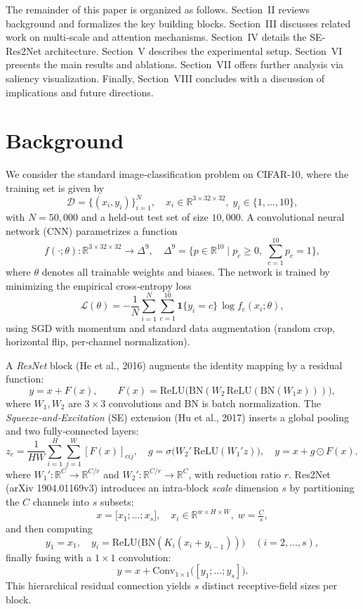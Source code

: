 \documentclass{article}
\begin{document}
The remainder of this paper is organized as follows. Section~II reviews background and formalizes the key building blocks. Section~III discusses related work on multi‐scale and attention mechanisms. Section~IV details the SE‐Res2Net architecture. Section~V describes the experimental setup. Section~VI presents the main results and ablations. Section~VII offers further analysis via saliency visualization. Finally, Section~VIII concludes with a discussion of implications and future directions.
\section{Background}
We consider the standard image‐classification problem on CIFAR‐10, where the training set is given by
\[
\mathcal{D} = \bigl\{(x_i,y_i)\bigr\}_{i=1}^N,\quad
x_i\in\mathbb{R}^{3\times32\times32},\;
y_i\in\{1,\dots,10\},
\]
with \(N=50{,}000\) and a held‐out test set of size \(10{,}000\).  A convolutional neural network (CNN) parametrizes a function
\[
f(\cdot;\theta)\colon\mathbb{R}^{3\times32\times32}\to\Delta^{9},\quad
\Delta^{9}=\{p\in\mathbb{R}^{10}\mid p_c\ge0,\;\sum_{c=1}^{10}p_c=1\},
\]
where \(\theta\) denotes all trainable weights and biases.  The network is trained by minimizing the empirical cross‐entropy loss
\[
\mathcal{L}(\theta)
=-\frac{1}{N}\sum_{i=1}^N\sum_{c=1}^{10}\mathbf{1}\{y_i=c\}\,\log f_c(x_i;\theta),
\]
using SGD with momentum and standard data augmentation (random crop, horizontal flip, per‐channel normalization).  

A \emph{ResNet} block (He et al., 2016) augments the identity mapping by a residual function:
\[
y = x + F(x),\qquad
F(x)=\mathrm{ReLU}\bigl(\mathrm{BN}(W_2\,\mathrm{ReLU}(\mathrm{BN}(W_1 x)))\bigr),
\]
where \(W_1,W_2\) are \(3\times3\) convolutions and BN is batch normalization.  The \emph{Squeeze‐and‐Excitation} (SE) extension (Hu et al., 2017) inserts a global pooling and two fully‐connected layers:
\[
z_c = \frac{1}{H W}\sum_{i=1}^H\sum_{j=1}^W [F(x)]_{cij},\quad
g = \sigma\bigl(W_2'\,\mathrm{ReLU}(W_1' z)\bigr),\quad
y = x + g\odot F(x),
\]
where \(W_1':\mathbb{R}^C\!\to\!\mathbb{R}^{C/r}\) and \(W_2':\mathbb{R}^{C/r}\!\to\!\mathbb{R}^C\), with reduction ratio \(r\).  Res2Net (arXiv 1904.01169v3) introduces an intra‐block \emph{scale} dimension \(s\) by partitioning the \(C\) channels into \(s\) subsets:
\[
x = \bigl[x_1;\dots;x_s\bigr],\quad x_i\in\mathbb{R}^{w\times H\times W},\;w=\tfrac{C}{s},
\]
and then computing
\[
y_1 = x_1,\quad
y_i = \mathrm{ReLU}\bigl(\mathrm{BN}(K_i(x_i + y_{i-1}))\bigr)\quad (i=2,\dots,s),
\]
finally fusing with a \(1\times1\) convolution:
\[
y = x + \mathrm{Conv}_{1\times1}\bigl([y_1;\dots;y_s]\bigr).
\]
This hierarchical residual connection yields \(s\) distinct receptive‐field sizes per block.  
\end{document}
